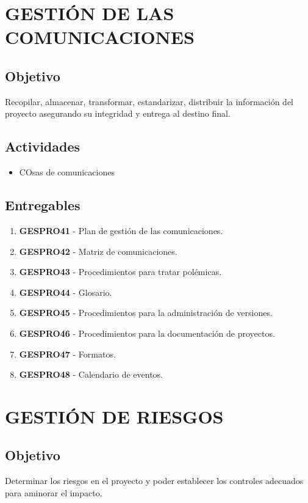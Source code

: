 \chapter{GESTI\'ON DE LAS COMUNICACIONES}

\section{Objetivo}
Recopilar, almacenar, transformar, estandarizar, distribuir la informaci\'on del proyecto 
asegurando su integridad y entrega al destino final.

\section{Actividades}
\begin{itemize}
	\item COsas de comunicaciones
\end{itemize}

\section{Entregables}

\begin{enumerate}
	\item \textbf{GESPRO41} - Plan de gesti\'on de las comunicaciones.
	\item \textbf{GESPRO42} - Matriz de comunicaciones.
	\item \textbf{GESPRO43} - Procedimientos para tratar pol\'emicas.
	\item \textbf{GESPRO44} - Glosario.
	\item \textbf{GESPRO45} - Procedimientos para la administraci\'on de versiones.
	\item \textbf{GESPRO46} - Procedimientos para la documentaci\'on de proyectos.
	\item \textbf{GESPRO47} - Formatos.
	\item \textbf{GESPRO48} - Calendario de eventos.
\end{enumerate}

\chapter{GESTI\'ON DE RIESGOS}

\section{Objetivo}
Determinar los riesgos en el proyecto y poder establecer los controles adecuados
para aminorar el impacto.

